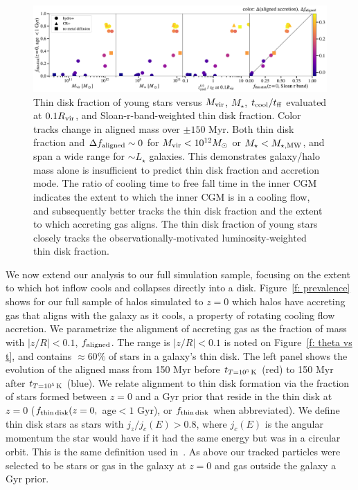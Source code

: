 \documentclass[fleqn,usenatbib]{mnras}
\newcommand{\tcon}{t_{T=10^5\,{\rm K}}}
\begin{document}
\begin{figure}
    \centering
    \includegraphics[width=\textwidth]{figures/prevalence/aligned_fraction_vs_galaxy_props.pdf}
    \caption{
    Thin disk fraction of young stars versus $M_{\rm vir}$, $M_\star$, $t_{\rm cool}/t_{\rm ff}$ evaluated at $0.1 R_{\rm vir}$, and Sloan-r-band-weighted thin disk fraction.
    Color tracks change in aligned mass over $\pm 150$ Myr.
    Both thin disk fraction and $\Delta f_{\rm aligned} \sim 0$ for $M_{\rm vir} < 10^{12} M_\odot$ or $M_\star < M_{\star, {\rm MW}}$, and span a wide range for $\sim L_\star$ galaxies.
    This demonstrates galaxy/halo mass alone is insufficient to predict thin disk fraction and accretion mode.
    The ratio of cooling time to free fall time in the inner CGM indicates the extent to which the inner CGM is in a cooling flow, and subsequently better tracks the thin disk fraction and the extent to which accreting gas aligns.
    The thin disk fraction of young stars closely tracks the observationally-motivated luminosity-weighted thin disk fraction.
    }
    \label{f: prevalence vs galaxy properties}
\end{figure}

We now extend our analysis to our full simulation sample, focusing on the extent to which hot inflow cools and collapses directly into a disk.
Figure~\ref{f: prevalence} shows for our full sample of halos simulated to $z=0$ which halos have accreting gas that aligns with the galaxy as it cools, a property of rotating cooling flow accretion.
We parametrize the alignment of accreting gas as the fraction of mass with $\vert z/R \vert < 0.1$, $f_{\rm aligned}$.
The range is $\vert z/R \vert < 0.1$ is noted on Figure~\ref{f: theta vs t}, and contains $\approx 60\%$ of stars in a galaxy's thin disk.
The left panel shows the evolution of the aligned mass from 150 Myr before $\tcon$ (red) to 150 Myr after $\tcon$ (blue).
We relate alignment to thin disk formation via the fraction of stars formed between $z=0$ and a Gyr prior that reside in the thin disk at $z=0$ ($f_{\rm thin\,disk}(z=0,$ age$<1$ Gyr), or $f_{\rm thin\,disk}$ when abbreviated).
We define thin disk stars as stars with $j_z/j_c(E) > 0.8$, where $j_c(E)$ is the angular momentum the star would have if it had the same energy but was in a circular orbit.
This is the same definition used in~\cite{Yu2021}.
As above our tracked particles were selected to be stars or gas in the galaxy at $z=0$ and gas outside the galaxy a Gyr prior.
\end{document}
